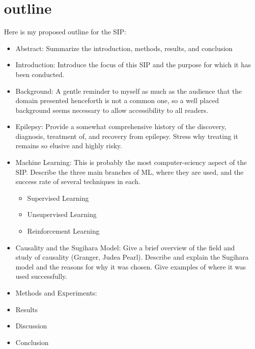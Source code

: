 \section{outline}
Here is my proposed outline for the SIP:
\begin{itemize}
  \item Abstract: Summarize the introduction, methods, results, and conclusion

  \item Introduction: Introduce the focus of this SIP and the purpose for which it has been conducted.

  \item Background: A gentle reminder to myself as much as the audience that the domain presented henceforth is not a common one, so a well placed background seems necessary to allow accessibility to all readers.

	\item Epilepsy: Provide a somewhat comprehensive history of the discovery, diagnosis, treatment of, and recovery from epilepsy. Stress why treating it remains so elusive and highly risky.

	\item Machine Learning: This is probably the most computer-sciency aspect of the SIP. Describe the three main branches of ML, where they are used, and the success rate of several techniques in each.
		\begin{itemize}
			\item Supervised Learning
			\item Unsupervised Learning
			\item Reinforcement Learning
		\end{itemize}

	\item Causality and the Sugihara Model: Give a brief overview of the field and study of causality (Granger, Judea Pearl). Describe and explain the Sugihara model and the reasons for why it was chosen. Give examples of where it was used successfully.
  \item Methods and Experiments: 

  \item Results

  \item Discussion
  
  \item Conclusion 
\end{itemize}